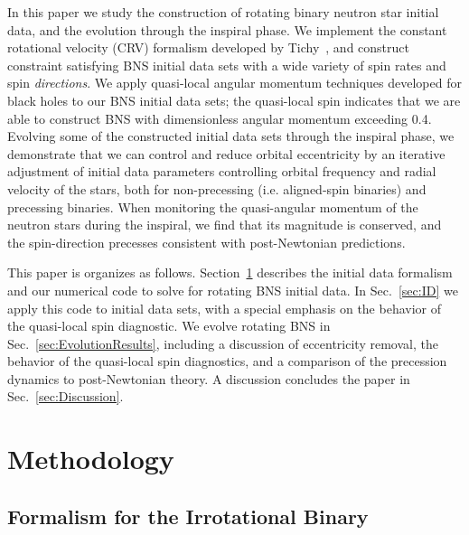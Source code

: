 \documentclass[aps,prd,amsmath,floatfix
,twocolumn
,superscriptaddress,nofootinbib,showpacs]{revtex4-1}
\theoremstyle{plain} \newtheorem{thm}{Theorem} \newtheorem{lem}{Lemma}
\newcommand{\red}[1]{\textcolor{Red}{#1}}
\begin{document}

In this paper we study the construction of rotating binary neutron
star initial data, and the evolution through the inspiral phase.  We
implement the constant rotational velocity (CRV) formalism developed
by Tichy~\cite{Tichy:2012rp}, and construct constraint satisfying BNS
initial data sets with a wide variety of spin rates and spin
\emph{directions}.  We apply quasi-local angular momentum techniques
developed for black holes to our BNS initial data sets; the
quasi-local spin indicates that we are able to construct BNS with
dimensionless angular momentum exceeding 0.4.  Evolving some of the
constructed initial data sets through the inspiral phase, we
demonstrate that we can control and reduce orbital eccentricity by an
iterative adjustment of initial data parameters controlling orbital
frequency and radial velocity of the stars, both for non-precessing
(i.e. aligned-spin binaries) and precessing binaries.  When monitoring
the quasi-angular momentum of the neutron stars during the inspiral,
we find that its magnitude is conserved, and the spin-direction
precesses consistent with post-Newtonian predictions.



This paper is organizes as follows.  Section~\ref{sec:Methodology}
describes the initial data formalism and our numerical code to solve
for rotating BNS initial data.  In Sec.~\ref{sec:ID} we apply this
code to initial data sets, with a special emphasis on the behavior of
the quasi-local spin diagnostic.  We evolve rotating BNS in
Sec.~\ref{sec:EvolutionResults}, including a discussion of
eccentricity removal, the behavior of the quasi-local spin
diagnostics, and a comparison of the precession dynamics to
post-Newtonian theory.  A discussion concludes the paper in
Sec.~\ref{sec:Discussion}.

\section{Methodology}
\label{sec:Methodology}

\subsection{Formalism for the Irrotational Binary}
\label{sec:IrrotFormalism}
\end{document}
